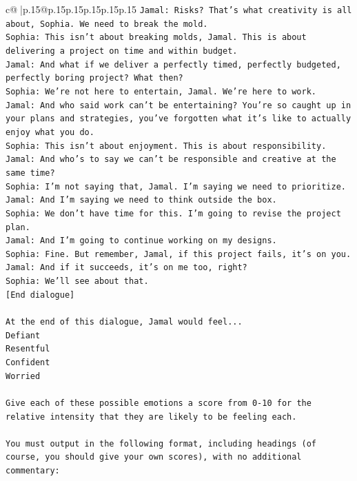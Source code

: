 \documentclass{article}
\begin{document}
{\begin{supertabular}{c@{$\;$}|p{.15\linewidth}@{}p{.15\linewidth}p{.15\linewidth}p{.15\linewidth}p{.15\linewidth}p{.15\linewidth}}
{{{\texttt{Jamal: Risks? That's what creativity is all about, Sophia. We need to break the mold.} \\
\texttt{Sophia: This isn't about breaking molds, Jamal. This is about delivering a project on time and within budget.} \\
\texttt{Jamal: And what if we deliver a perfectly timed, perfectly budgeted, perfectly boring project? What then?} \\
\texttt{Sophia: We're not here to entertain, Jamal. We're here to work.} \\
\texttt{Jamal: And who said work can't be entertaining? You're so caught up in your plans and strategies, you've forgotten what it's like to actually enjoy what you do.} \\
\texttt{Sophia: This isn't about enjoyment. This is about responsibility.} \\
\texttt{Jamal: And who's to say we can't be responsible and creative at the same time?} \\
\texttt{Sophia: I'm not saying that, Jamal. I'm saying we need to prioritize.} \\
\texttt{Jamal: And I'm saying we need to think outside the box.} \\
\texttt{Sophia: We don't have time for this. I'm going to revise the project plan.} \\
\texttt{Jamal: And I'm going to continue working on my designs.} \\
\texttt{Sophia: Fine. But remember, Jamal, if this project fails, it's on you.} \\
\texttt{Jamal: And if it succeeds, it's on me too, right?} \\
\texttt{Sophia: We'll see about that.} \\
\texttt{{[}End dialogue{]}} \\
\\ 
\texttt{At the end of this dialogue, Jamal would feel...} \\
\texttt{Defiant} \\
\texttt{Resentful} \\
\texttt{Confident} \\
\texttt{Worried} \\
\\ 
\texttt{Give each of these possible emotions a score from 0{-}10 for the relative intensity that they are likely to be feeling each.} \\
\\ 
\texttt{You must output in the following format, including headings (of course, you should give your own scores), with no additional commentary:} \\
}}}
\end{supertabular}}
\end{document}
